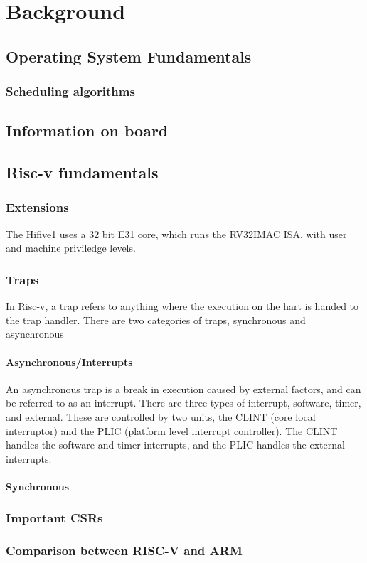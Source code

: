 \chapter[Background]{Background}
\label{cha:backgr}
\section{Operating System Fundamentals}
\subsection{Scheduling algorithms}
\section{Information on board}
\section{Risc-v fundamentals}
\subsection{Extensions}
The Hifive1 uses a 32 bit E31 core, which runs the RV32IMAC ISA, with user and machine priviledge levels. 
\subsection{Traps}
In Risc-v, a trap refers to anything where the execution on the hart is handed to the trap handler. There are two categories of traps, synchronous and asynchronous
\subsubsection{Asynchronous/Interrupts}
An asynchronous trap is a break in execution caused by external factors, and can be referred to as an interrupt. There are three types of interrupt, software, timer, and external. These are controlled by two units, the CLINT (core local interruptor) and the PLIC (platform level interrupt controller). The CLINT handles the software and timer interrupts, and the PLIC handles the external interrupts.
\subsubsection{Synchronous}
\subsection{Important CSRs}
\subsection{Comparison between RISC-V and ARM}